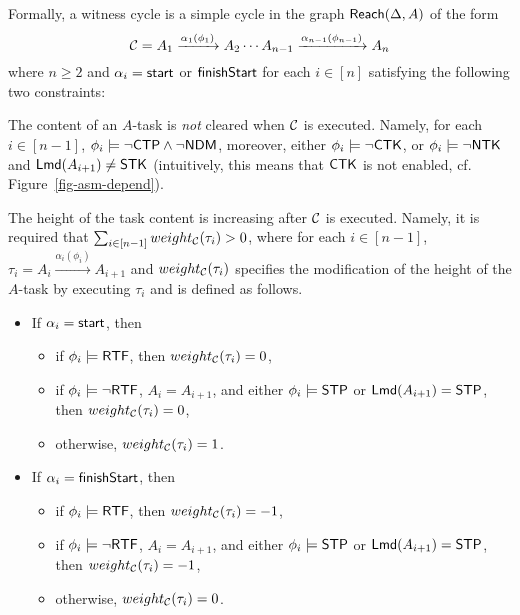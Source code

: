 Formally, a witness cycle is a simple cycle in the graph ${\sf Reach}(\Delta, A)$ of the form 
$${\mathcal{C} } = A_1 \xrightarrow{\alpha_1(\phi_1)} A_2 \cdots A_{n-1} \xrightarrow{\alpha_{n-1}(\phi_{n-1})} A_n$$ 
where $n \ge 2$ and $\alpha_i = {\mathsf{start} }$ or ${\mathsf{finishStart} }$ for each $i \in [n]$ satisfying the following two constraints: 
\smallskip

 The content of an $A$-task is \emph{not} cleared when %
${\mathcal{C} }$ is executed. Namely, for each $i \in [n-1]$, $\phi_i \models \neg {\sf CTP}\wedge\neg{\sf NDM}$, moreover, either $\phi_i \models \neg {\sf CTK}$, or $\phi_i \models  \neg {\sf NTK}$ and ${\sf Lmd}(A_{i+1}) \neq {\sf STK}$ (intuitively, this means that ${\sf CTK}$ is not enabled, cf. Figure~\ref{fig-asm-depend}).
%
\smallskip

 The height of the task content is increasing after 
${\mathcal{C} }$ is executed. Namely, it is required that $\sum_{i \in [n-1]} weight_{\mathcal{C} }(\tau_i)>0$, where for each $i \in [n-1]$, $\tau_i = A_i  \xrightarrow{\alpha_i(\phi_i)} A_{i+1}$ and $weight_{\mathcal{C} }(\tau_i)$ specifies the modification of the height of the $A$-task by executing $\tau_i$ and
%
is defined as follows.
\begin{itemize}
\item If $\alpha_i = {\mathsf{start} }$, then 
%
\begin{itemize}
\item if $\phi_i \models {\sf RTF}$, then $weight_{\mathcal{C} }(\tau_i)  = 0$,  
%
\item if $\phi_i \models \neg {\sf RTF}$, $A_i = A_{i+1}$, and either $\phi_i \models {\sf STP}$ or ${\sf Lmd}(A_{i+1}) = {\sf STP}$, then $weight_{\mathcal{C} }(\tau_i)  = 0$,   
%
\item otherwise,  $weight_{\mathcal{C} }(\tau_i)  = 1$.
\end{itemize}

\item If $\alpha_i = {\mathsf{finishStart} }$, then
\begin{itemize}
\item if $\phi_i \models {\sf RTF}$, then $weight_{\mathcal{C} }(\tau_i)  = -1$,  
%
\item if $\phi_i \models \neg {\sf RTF}$, $A_i = A_{i+1}$, and either $\phi_i \models {\sf STP}$ or ${\sf Lmd}(A_{i+1}) = {\sf STP}$, then $weight_{\mathcal{C} }(\tau_i)  = -1$,   
%
\item otherwise,  $weight_{\mathcal{C} }(\tau_i)  = 0$.
\end{itemize}
\end{itemize}

